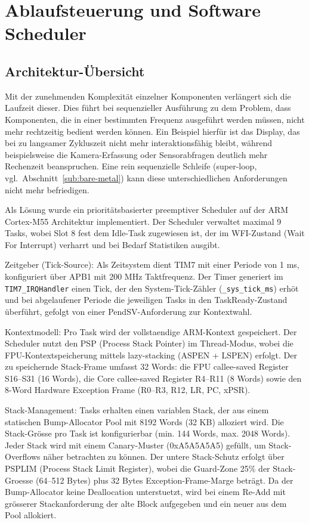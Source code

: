 \section{Ablaufsteuerung und Software Scheduler}\label{sec:scheduler}

\subsection{Architektur-Übersicht}\label{sub:scheduler-architektur}
Mit der zunehmenden Komplexität einzelner Komponenten verlängert sich die Laufzeit dieser. Dies führt bei sequenzieller Ausführung zu dem Problem, dass Komponenten, die in einer bestimmten Frequenz ausgeführt werden müssen, nicht mehr rechtzeitig bedient werden können. Ein Beispiel hierfür ist das Display, das bei zu langsamer Zykluszeit nicht mehr interaktionsfähig bleibt, während beispielsweise die Kamera-Erfassung oder Sensorabfragen deutlich mehr Rechenzeit beanspruchen. Eine rein sequenzielle Schleife (super-loop, vgl.\ Abschnitt~\ref{sub:bare-metal}) kann diese unterschiedlichen Anforderungen nicht mehr befriedigen.

Als Lösung wurde ein prioritätsbasierter preemptiver Scheduler auf der ARM Cortex-M55 Architektur implementiert. Der Scheduler verwaltet maximal 9 Tasks, wobei Slot 8 fest dem Idle-Task zugewiesen ist, der im WFI-Zustand (Wait For Interrupt) verharrt und bei Bedarf Statistiken ausgibt.

Zeitgeber (Tick-Source): Als Zeitsystem dient TIM7 mit einer Periode von 1 ms, konfiguriert über APB1 mit 200 MHz Taktfrequenz. Der Timer generiert im \texttt{TIM7\_IRQHandler} einen Tick, der den System-Tick-Zähler (\texttt{\_sys\_tick\_ms}) erhöt und bei abgelaufener Periode die jeweiligen Tasks in den TaskReady-Zustand überführt, gefolgt von einer PendSV-Anforderung zur Kontextwahl.

Kontextmodell: Pro Task wird der vollstaendige ARM-Kontext gespeichert. Der Scheduler nutzt den PSP (Process Stack Pointer) im Thread-Modus, wobei die FPU-Kontextspeicherung mittels lazy-stacking (ASPEN + LSPEN) erfolgt. Der zu speichernde Stack-Frame umfasst 32 Words: die FPU callee-saved Register S16–S31 (16 Words), die Core callee-saved Register R4–R11 (8 Words) sowie den 8-Word Hardware Exception Frame (R0–R3, R12, LR, PC, xPSR).

Stack-Management: Tasks erhalten einen variablen Stack, der aus einem statischen Bump-Allocator Pool mit 8192 Words (32 KB) alloziert wird. Die Stack-Grösse pro Task ist konfigurierbar (min. 144 Words, max. 2048 Words). Jeder Stack wird mit einem Canary-Muster (0xA5A5A5A5) gefüllt, um Stack-Overflows näher betrachten zu können. Der untere Stack-Schutz erfolgt über PSPLIM (Process Stack Limit Register), wobei die Guard-Zone 25\% der Stack-Groesse (64–512 Bytes) plus 32 Bytes Exception-Frame-Marge beträgt. Da der Bump-Allocator keine Deallocation unterstuetzt, wird bei einem Re-Add mit grösserer Stackanforderung der alte Block aufgegeben und ein neuer aus dem Pool allokiert.

